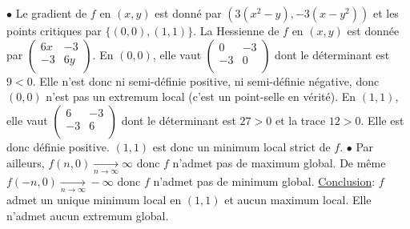 \documentclass{report}
\begin{document}
\subsection{} \noindent{}\\ 
\\ 
\\
\noindent 
$\bullet$ Le gradient de $f$ en $(x,y)$ est donné par $\left(3 \left(x^2-y\right),-3 \left(x-y^2\right)\right)$ et les points critiques par $\{(0,0),(1,1)\}$.\newline
La Hessienne de $f$ en $(x,y)$ est donnée par $\left(
\begin{array}{cc}
 6 x & -3 \\
 -3 & 6 y \\
\end{array}
\right)$.\newline
En $(0,0)$, elle vaut $\left(
\begin{array}{cc}
 0 & -3 \\
 -3 & 0 \\
\end{array}
\right)$ dont le déterminant est $9<0$. Elle n'est donc ni semi-définie positive, ni semi-définie négative, donc $(0,0)$ n'est pas un extremum local (c'est un point-selle en vérité).\newline
En $(1,1)$, elle vaut $\left(
\begin{array}{cc}
 6 & -3 \\
 -3 & 6 \\
\end{array}
\right)$ dont le déterminant est $27>0$ et la trace $12>0$. Elle est donc définie positive. $(1,1)$ est donc un minimum local strict de $f$. \newline
$\bullet$ Par ailleurs, $f(n,0)\xrightarrow[n\to \infty]{}\infty$ donc $f$ n'admet pas de maximum global. \newline
De même $f(-n,0)\xrightarrow[n\to \infty]{}-\infty$ donc $f$ n'admet pas de minimum global.
\newline
\newline
\underline{Conclusion}: $f$ admet un unique minimum local en $(1,1)$ et aucun maximum local. Elle n'admet aucun extremum global.
\end{document}
